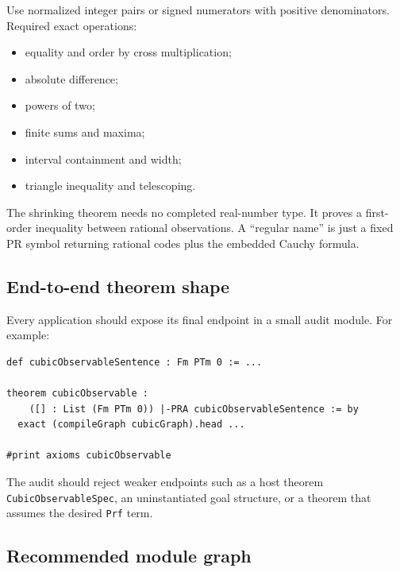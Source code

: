 Use normalized integer pairs or signed numerators with positive denominators.
Required exact operations:

\begin{itemize}
\item equality and order by cross multiplication;
\item absolute difference;
\item powers of two;
\item finite sums and maxima;
\item interval containment and width;
\item triangle inequality and telescoping.
\end{itemize}

The shrinking theorem needs no completed real-number type.  It proves a
first-order inequality between rational observations.  A ``regular name'' is
just a fixed PR symbol returning rational codes plus the embedded Cauchy
formula.

\subsection{End-to-end theorem shape}

Every application should expose its final endpoint in a small audit module.
For example:

\begin{lstlisting}[language={}]
def cubicObservableSentence : Fm PTm 0 := ...

theorem cubicObservable :
    ([] : List (Fm PTm 0)) |-PRA cubicObservableSentence := by
  exact (compileGraph cubicGraph).head ...

#print axioms cubicObservable
\end{lstlisting}

The audit should reject weaker endpoints such as a host theorem
\texttt{CubicObservableSpec}, an uninstantiated goal structure, or a theorem
that assumes the desired \texttt{Prf} term.

\subsection{Recommended module graph}

